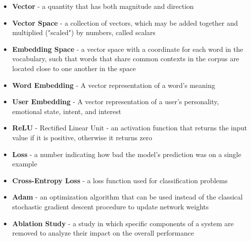 \documentclass{article}
\begin{document}
\begin{itemize}
	\item \textbf{Vector} - a quantity that has both magnitude and direction
	\item \textbf{Vector Space} - a collection of vectors, which may be added together and multiplied ("scaled") by numbers, called scalars
	\item \textbf{Embedding Space} - a vector space with a coordinate for each word in the vocabulary, such that words that share common contexts in the corpus are located close to one another in the space
	\item \textbf{Word Embedding} - A vector representation of a word's meaning
	\item \textbf{User Embedding} - A vector representation of a user's personality, emotional state, intent, and interest
	\item \textbf{ReLU} - Rectified Linear Unit - an activation function that returns the input value if it is positive, otherwise it returns zero
	\item \textbf{Loss} - a number indicating how bad the model's prediction was on a single example
	\item \textbf{Cross-Entropy Loss} - a loss function used for classification problems
	\item \textbf{Adam} - an optimization algorithm that can be used instead of the classical stochastic gradient descent procedure to update network weights
	\item \textbf{Ablation Study} - a study in which specific components of a system are removed to analyze their impact on the overall performance
\end{itemize}
\end{document}

